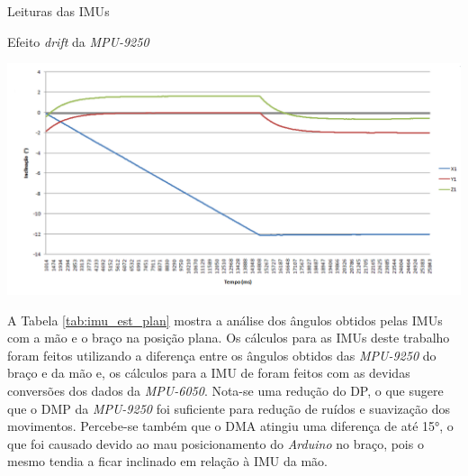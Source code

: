 \begin{grafico}[H]
\ContinuedFloat
  \setlength{\abovecaptionskip}{0pt}
  \setlength{\belowcaptionskip}{0pt}
  \caption[Leituras das \ac{IMU}s]{Leituras das \ac{IMU}s}
  \centering
  \captionsetup{justification=centering}
  \label{fig:graf_mpu2}
\end{grafico}

\begin{grafico}[H]
  \setlength{\abovecaptionskip}{0pt}
  \setlength{\belowcaptionskip}{0pt}
  \caption[Efeito \textit{drift} da \textit{MPU-9250}]{Efeito \textit{drift} da \textit{MPU-9250}}
  \centering
  \includegraphics[width=.7\textwidth]{imagem/drift_mpu1.png}
  \captionsetup{justification=centering}
  \label{fig:grafdrift}
\end{grafico}

A Tabela \ref{tab:imu_est_plan} mostra a análise dos ângulos obtidos pelas \ac{IMU}s com a mão e o braço na posição plana. Os cálculos para as \ac{IMU}s deste trabalho foram feitos utilizando a diferença entre os ângulos obtidos das \textit{MPU-9250} do braço e da mão e, os cálculos para a \ac{IMU} de  foram feitos com as devidas conversões dos dados da \textit{MPU-6050}. Nota-se uma redução do \ac{DP}, o que sugere que o \ac{DMP} da \textit{MPU-9250} foi suficiente para redução de ruídos e suavização dos movimentos. Percebe-se também que o \ac{DMA} atingiu uma diferença de até \ang{15}, o que foi causado devido ao mau posicionamento do \textit{Arduino} no braço, pois o mesmo tendia a ficar inclinado em relação à \ac{IMU} da mão.

